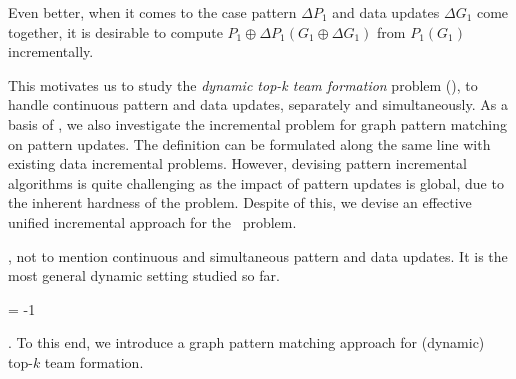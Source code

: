 {\begin{example}
 Even better, when it comes to the case pattern $\Delta P_{1}$ and data updates $\Delta G_{1}$ come together, it is desirable to compute $P_{1}\oplus\Delta P_{1}(G_{1}\oplus\Delta G_{1})$ from $P_{1}(G_{1})$ incrementally.
\end{example}

This motivates us to study the {\em dynamic top-k team formation} problem (\dynteamF), to handle continuous 
pattern and data updates, separately and simultaneously.
As a basis of \dynteamF, we also investigate the incremental problem for graph pattern matching on pattern updates. 
The definition can be formulated along the same line with existing data incremental problems.
However, devising pattern incremental algorithms is quite challenging as the impact of pattern updates is global,
due to the inherent hardness of the problem.
Despite of this, we devise an effective unified incremental approach for the \dynteamF\, problem.

,
not to mention continuous and simultaneous pattern and data updates. It is the most general dynamic setting studied so far.} 
\looseness = -1

. To this end,  we introduce a graph pattern matching approach for (dynamic) top-$k$ team formation.


